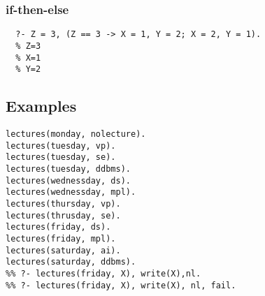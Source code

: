 \subsubsection{if-then-else}
\begin{lstlisting}
  ?- Z = 3, (Z == 3 -> X = 1, Y = 2; X = 2, Y = 1).
  % Z=3
  % X=1
  % Y=2
\end{lstlisting}

\subsection{Examples}
\begin{lstlisting}
lectures(monday, nolecture).
lectures(tuesday, vp).
lectures(tuesday, se).
lectures(tuesday, ddbms).
lectures(wednessday, ds).
lectures(wednessday, mpl).
lectures(thursday, vp).
lectures(thrusday, se).
lectures(friday, ds).
lectures(friday, mpl).
lectures(saturday, ai).
lectures(saturday, ddbms).
%% ?- lectures(friday, X), write(X),nl.
%% ?- lectures(friday, X), write(X), nl, fail.
\end{lstlisting}




